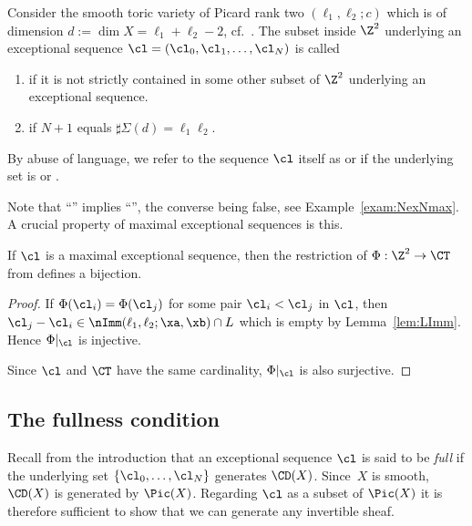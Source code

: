 \begin{defi}
\label{def:MaxExc}
Consider the smooth toric 
variety of Picard rank two 
$(\ell_1,\ell_2;c)$ which
is of dimension $d:=\dim X=\ell_1+\ell_2-2$,
cf.~. The 
subset inside $\Z^2$ underlying 
an exceptional sequence 
$\cl=(\cl_0,\cl_1,\ldots,\cl_N)$ 
is called
\begin{enumerate}
\item[(i)] 
{\em \nex} if it is not strictly contained 
in some other subset of $\Z^2$ underlying 
an exceptional sequence.
\vspace{1ex}
\item[(ii)] 
{\em \tm} if $N+1$ equals 
$\sharp\Sigma(d)=\ell_1\ell_2$.
\end{enumerate}
By abuse of language, we refer to the 
sequence $\cl$ itself as {\nex} or {\tm} 
if the underlying set is {\nex} or {\tm}. 
\end{defi}

Note that ``\tm'' implies ``\nex'', 
the converse being false, see 
Example~\ref{exam:NexNmax}. A crucial 
property of maximal exceptional sequences 
is this. 

\begin{lemma}
\label{lem:PhiMap}
If $\cl$ is a maximal exceptional sequence, 
then the restriction of $\Phi:\Z^2\to\CT$ 
from 
defines a bijection.
\end{lemma}

\begin{proof}
If $\Phi(\cl_i)=\Phi(\cl_j)$ for some pair 
$\cl_i<\cl_j$ in $\cl$, then $\cl_j-\cl_i
\in\nImm(\ell_1,\ell_2;\xa,\xb)\cap L$ which 
is empty by Lemma~\ref{lem:LImm}. Hence 
$\Phi|_\cl$ is injective.

Since $\cl$ and $\CT$ have the same cardinality, 
$\Phi|_\cl$ is also surjective.
\end{proof}

\subsection{The fullness condition}
\label{subsec:FullCond}
Recall from the introduction that an 
exceptional sequence $\cl$ is said to 
be {\em full} if the underlying set 
$\{\cl_0,\ldots,\cl_N\}$ generates 
$\CD(X)$. Since~$X$ is smooth, 
$\CD(X)$ is generated by $\Pic(X)$. 
Regarding $\cl$ as a subset of $\Pic(X)$ 
it is therefore sufficient to show that 
we can generate any invertible sheaf.

